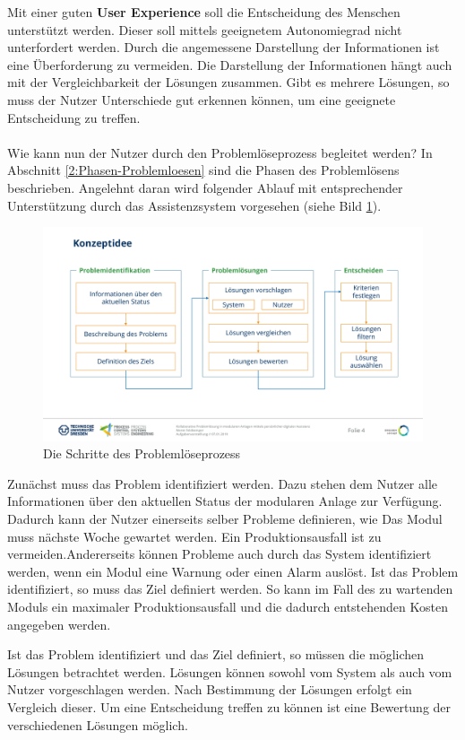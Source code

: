 Mit einer guten \textbf{User Experience} soll die Entscheidung des Menschen unterstützt werden. Dieser soll mittels geeignetem Autonomiegrad nicht unterfordert werden. Durch die angemessene Darstellung der Informationen ist eine Überforderung zu vermeiden. Die Darstellung der Informationen hängt auch mit der Vergleichbarkeit der Lösungen zusammen. Gibt es mehrere Lösungen, so muss der Nutzer Unterschiede gut erkennen können, um eine geeignete Entscheidung zu treffen.
\\ \\
Wie kann nun der Nutzer durch den Problemlöseprozess begleitet werden? In Abschnitt \ref{2:Phasen-Problemloesen} sind die Phasen des Problemlösens beschrieben. Angelehnt daran wird folgender Ablauf mit entsprechender Unterstützung durch das Assistenzsystem vorgesehen (siehe Bild \ref{pic:Konzeptidee}).
\begin{figure}[htbp]
\centering
\includegraphics[scale=0.45]{DA_files/Bilder/Konzept/Konzeptidee.pdf}
\caption{Die Schritte des Problemlöseprozess}
\label{pic:Konzeptidee}
\end{figure}

Zunächst muss das Problem identifiziert werden. Dazu stehen dem Nutzer alle Informationen über den aktuellen Status der modularen Anlage zur Verfügung. Dadurch kann der Nutzer einerseits selber Probleme definieren, wie \glqq Das Modul muss nächste Woche gewartet werden. Ein Produktionsausfall ist zu vermeiden.\grqq Andererseits können Probleme auch durch das System identifiziert werden, wenn ein Modul eine Warnung oder einen Alarm auslöst. Ist das Problem identifiziert, so muss das Ziel definiert werden. So kann im Fall des zu wartenden Moduls ein maximaler Produktionsausfall und die dadurch entstehenden Kosten angegeben werden.

Ist das Problem identifiziert und das Ziel definiert, so müssen die möglichen Lösungen betrachtet werden. Lösungen können sowohl vom System als auch vom Nutzer vorgeschlagen werden. Nach Bestimmung der Lösungen erfolgt ein Vergleich dieser. Um eine Entscheidung treffen zu können ist eine Bewertung der verschiedenen Lösungen möglich.

